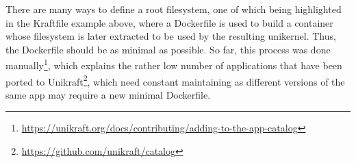 There are many ways to define a root filesystem, one of which being highlighted in the Kraftfile example above, where a Dockerfile is used to build a container whose filesystem is later extracted to be used
by the resulting unikernel. Thus, the Dockerfile should be as minimal as possible. So far, this process was done manually\footnote{
    \url{https://unikraft.org/docs/contributing/adding-to-the-app-catalog}
}, which explains the rather low number of applications that have been ported to Unikraft\footnote{
    \url{https://github.com/unikraft/catalog}
}, which need constant maintaining as different versions of the same app may require a new minimal Dockerfile. 